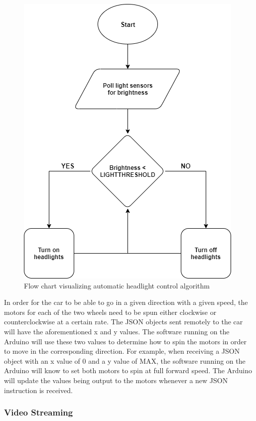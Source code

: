 \documentclass[letterpaper,12pt]{report}
\begin{document}
    \begin{figure}[H]
        \centering
        \includegraphics[width=0.6\linewidth]{diagrams/Headlights_Flowchart.png}
        \caption{Flow chart visualizing automatic headlight control algorithm}
        \label{fig:headlights}
    \end{figure}

    In order for the car to be able to go in a given direction with a given
    speed, the motors for each of the two wheels need to be spun either
    clockwise or counterclockwise at a certain rate. The JSON objects sent
    remotely to the car will have the aforementioned x and y values. The
    software running on the Arduino will use these two values to determine how
    to spin the motors in order to move in the corresponding direction.  For
    example, when receiving a JSON object with an x value of 0 and a y value of
    MAX, the software running on the Arduino will know to set both motors to
    spin at full forward speed. The Arduino will update the values being output
    to the motors whenever a new JSON instruction is received.

    \subsubsection{Video Streaming}
\end{document}
